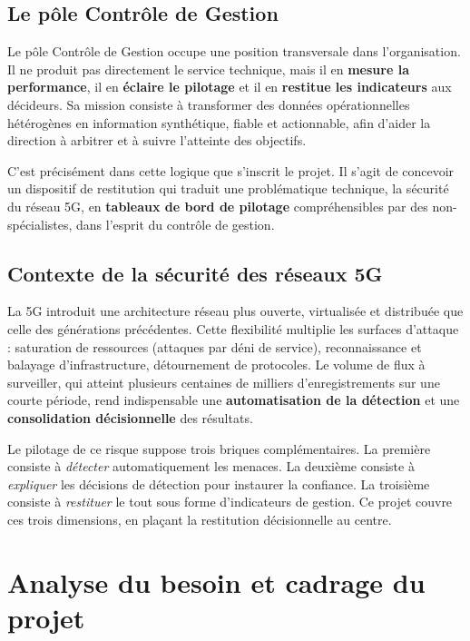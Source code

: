 \documentclass[12pt,a4paper,oneside]{report}
\begin{document}
\section{Le pôle Contrôle de Gestion}
Le pôle Contrôle de Gestion occupe une position transversale dans l'organisation. Il ne produit pas directement le service technique, mais il en \textbf{mesure la performance}, il en \textbf{éclaire le pilotage} et il en \textbf{restitue les indicateurs} aux décideurs. Sa mission consiste à transformer des données opérationnelles hétérogènes en information synthétique, fiable et actionnable, afin d'aider la direction à arbitrer et à suivre l'atteinte des objectifs.

C'est précisément dans cette logique que s'inscrit le projet. Il s'agit de concevoir un dispositif de restitution qui traduit une problématique technique, la sécurité du réseau 5G, en \textbf{tableaux de bord de pilotage} compréhensibles par des non-spécialistes, dans l'esprit du contrôle de gestion.

\section{Contexte de la sécurité des réseaux 5G}
La 5G introduit une architecture réseau plus ouverte, virtualisée et distribuée que celle des générations précédentes. Cette flexibilité multiplie les surfaces d'attaque : saturation de ressources (attaques par déni de service), reconnaissance et balayage d'infrastructure, détournement de protocoles. Le volume de flux à surveiller, qui atteint plusieurs centaines de milliers d'enregistrements sur une courte période, rend indispensable une \textbf{automatisation de la détection} et une \textbf{consolidation décisionnelle} des résultats.

Le pilotage de ce risque suppose trois briques complémentaires. La première consiste à \emph{détecter} automatiquement les menaces. La deuxième consiste à \emph{expliquer} les décisions de détection pour instaurer la confiance. La troisième consiste à \emph{restituer} le tout sous forme d'indicateurs de gestion. Ce projet couvre ces trois dimensions, en plaçant la restitution décisionnelle au centre.

\chapter{Analyse du besoin et cadrage du projet}
\end{document}
